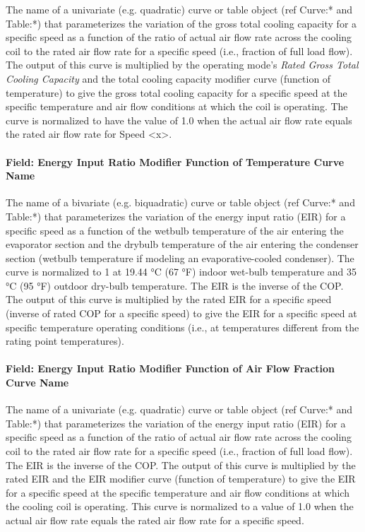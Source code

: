 The name of a univariate (e.g. quadratic) curve or table object (ref Curve:* and Table:*) that parameterizes the variation of the gross total cooling capacity for a specific speed as a function of the ratio of actual air flow rate across the cooling coil to the rated air flow rate for a specific speed (i.e., fraction of full load flow). The output of this curve is multiplied by the operating mode's \textit{Rated Gross Total Cooling Capacity} and the total cooling capacity modifier curve (function of temperature) to give the gross total cooling capacity for a specific speed at the specific temperature and air flow conditions at which the coil is operating. The curve is normalized to have the value of 1.0 when the actual air flow rate equals the rated air flow rate for Speed \textless{}x\textgreater{}.

\paragraph{Field: Energy Input Ratio Modifier Function of Temperature Curve Name}

The name of a bivariate (e.g. biquadratic) curve or table object (ref Curve:* and Table:*) that parameterizes the variation of the energy input ratio (EIR) for a specific speed as a function of the wetbulb temperature of the air entering the evaporator section and the drybulb temperature of the air entering the condenser section (wetbulb temperature if modeling an evaporative-cooled condenser). The curve is normalized to 1 at 19.44 °C (67 °F) indoor wet-bulb temperature and 35 °C (95 °F) outdoor dry-bulb temperature. The EIR is the inverse of the COP. The output of this curve is multiplied by the rated EIR for a specific speed (inverse of rated COP for a specific speed) to give the EIR for a specific speed at specific temperature operating conditions (i.e., at temperatures different from the rating point temperatures).

\paragraph{Field: Energy Input Ratio Modifier Function of Air Flow Fraction Curve Name}\label{field-energy-input-ratio-function-of-air-flow-fraction-curve-name}

The name of a univariate (e.g. quadratic) curve or table object (ref Curve:* and Table:*) that parameterizes the variation of the energy input ratio (EIR) for a specific speed as a function of the ratio of actual air flow rate across the cooling coil to the rated air flow rate for a specific speed (i.e., fraction of full load flow). The EIR is the inverse of the COP. The output of this curve is multiplied by the rated EIR and the EIR modifier curve (function of temperature) to give the EIR for a specific speed at the specific temperature and air flow conditions at which the cooling coil is operating. This curve is normalized to a value of 1.0 when the actual air flow rate equals the rated air flow rate for a specific speed.

